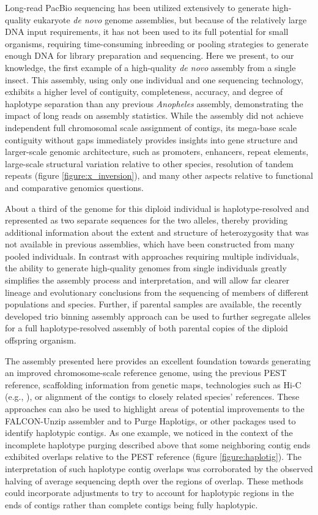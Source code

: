 \par{
Long-read PacBio sequencing has been utilized extensively to generate high-quality eukaryote \textit{de novo} genome assemblies, but because of the relatively large DNA input requirements, it has not been used to its full potential for small organisms, requiring time-consuming inbreeding or pooling strategies to generate enough DNA for library preparation and sequencing. Here we present, to our knowledge, the first example of a high-quality \textit{de novo} assembly from a single insect. This assembly, using only one individual and one sequencing technology, exhibits a higher level of contiguity, completeness, accuracy, and degree of haplotype separation than any previous \textit{Anopheles} assembly, demonstrating the impact of long reads on assembly statistics. While the assembly did not achieve independent full chromosomal scale assignment of contigs, its mega-base scale contiguity without gaps immediately provides insights into gene structure and larger-scale genomic architecture, such as promoters, enhancers, repeat elements, large-scale structural variation relative to other species, resolution of tandem repeats (figure \ref{figure:x_inversion}), and many other aspects relative to functional and comparative genomics questions.
} 
\par{
About a third of the genome for this diploid individual is haplotype-resolved and represented as two separate sequences for the two alleles, thereby providing additional information about the extent and structure of heterozygosity that was not available in previous assemblies, which have been constructed from many pooled individuals. In contrast with approaches requiring multiple individuals, the ability to generate high-quality genomes from single individuals greatly simplifies the assembly process and interpretation, and will allow far clearer lineage and evolutionary conclusions from the sequencing of members of different populations and species. Further, if parental samples are available, the recently developed trio binning assembly approach \cite{triobinning} can be used to further segregate alleles for a full haplotype-resolved assembly of both parental copies of the diploid offspring organism.
} 
\par{
The assembly presented here provides an excellent foundation towards generating an improved chromosome-scale reference genome, using the previous PEST reference, scaffolding information from genetic maps, technologies such as Hi-C (e.g., \cite{falconphase}), or alignment of the contigs to closely related species' references. These approaches can also be used to highlight areas of potential improvements to the FALCON-Unzip assembler and to Purge Haplotigs, or other packages used to identify haplotypic contigs. As one example, we noticed in the context of the incomplete haplotype purging described above that some neighboring contig ends exhibited overlaps relative to the PEST reference (figure \ref{figure:haplotig}). The interpretation of such haplotype contig overlaps was corroborated by the observed halving of average sequencing depth over the regions of overlap. These methods could incorporate adjustments to try to account for haplotypic regions in the ends of contigs rather than complete contigs being fully haplotypic.
} 

